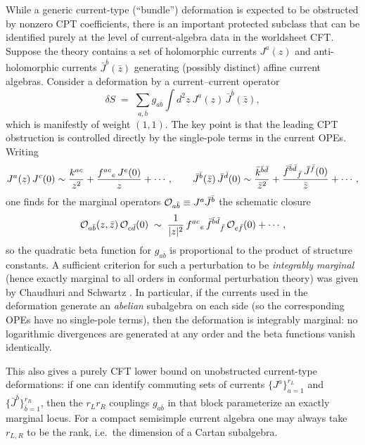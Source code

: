 \documentclass[12pt]{article}
\newcommand{\bz}{\bar{z}}
\begin{document}
				While a generic current-type (``bundle'') deformation is expected to be obstructed by nonzero CPT coefficients, there is an important protected subclass that can be identified purely at the level of current-algebra data in the worldsheet CFT.
				Suppose the theory contains a set of holomorphic currents $J^a(z)$ and anti-holomorphic currents $\bar J^{\bar b}(\bz)$ generating (possibly distinct) affine current algebras. Consider a deformation by a current--current operator
			\[
			\delta S \;=\; \sum_{a,\bar b} g_{a\bar b}\int d^2z~J^a(z)\,\bar J^{\bar b}(\bz),
			\]
			which is manifestly of weight $(1,1)$. The key point is that the leading CPT obstruction is controlled directly by the single-pole terms in the current OPEs. Writing
			\[
			J^a(z)\,J^c(0)\sim {k^{ac}\over z^2}+{f^{ac}{}_{e}\,J^e(0)\over z}+\cdots,
			\qquad
			\bar J^{\bar b}(\bz)\,\bar J^{\bar d}(0)\sim {\bar k^{\bar b\bar d}\over \bz^2}+{\bar f^{\bar b\bar d}{}_{\bar f}\,\bar J^{\bar f}(0)\over \bz}+\cdots,
			\]
			one finds for the marginal operators ${\cal O}_{a\bar b}\equiv J^a\bar J^{\bar b}$ the schematic closure
			\[
			{\cal O}_{a\bar b}(z,\bz)\,{\cal O}_{c\bar d}(0)\;\sim\;{1\over |z|^2}\,f^{ac}{}_{e}\,\bar f^{\bar b\bar d}{}_{\bar f}\,{\cal O}_{e\bar f}(0)+\cdots,
			\]
			so the quadratic beta function for $g_{a\bar b}$ is proportional to the product of structure constants. A sufficient criterion for such a perturbation to be \emph{integrably marginal} (hence exactly marginal to all orders in conformal perturbation theory) was given by Chaudhuri and Schwartz \cite{Chaudhuri:1988qb}. In particular, if the currents used in the deformation generate an \emph{abelian} subalgebra on each side (so the corresponding OPEs have no single-pole terms), then the deformation is integrably marginal: no logarithmic divergences are generated at any order and the beta functions vanish identically.
			
			This also gives a purely CFT lower bound on unobstructed current-type deformations: if one can identify commuting sets of currents $\{J^{a}\}_{a=1}^{r_L}$ and $\{\bar J^{\bar b}\}_{\bar b=1}^{r_R}$, then the $r_L r_R$ couplings $g_{a\bar b}$ in that block parameterize an exactly marginal locus. For a compact semisimple current algebra one may always take $r_{L,R}$ to be the rank, i.e.\ the dimension of a Cartan subalgebra.
			
\end{document}
